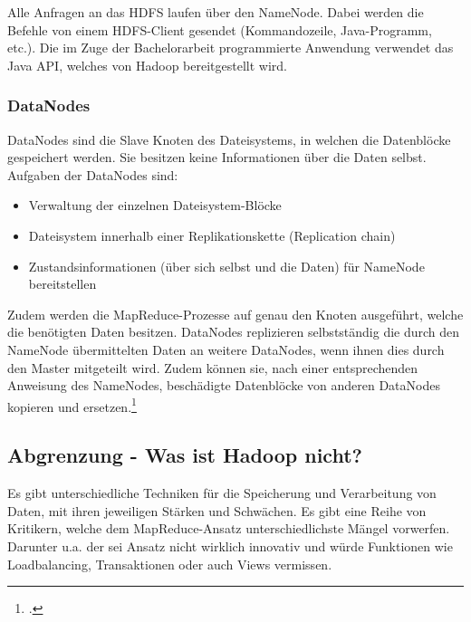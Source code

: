 Alle Anfragen an das \ac{HDFS} laufen über den NameNode. Dabei werden die Befehle von einem \ac{HDFS}-Client gesendet (Kommandozeile, Java-Programm, etc.). Die im Zuge der Bachelorarbeit programmierte Anwendung verwendet das Java \ac{API}, welches von Hadoop bereitgestellt wird.

\subsubsection{DataNodes}
DataNodes sind die Slave Knoten des Dateisystems, in welchen die Datenblöcke gespeichert werden. Sie besitzen keine Informationen über die Daten selbst. Aufgaben der DataNodes sind:

\begin{itemize}
	\item Verwaltung der einzelnen Dateisystem-Blöcke
	\item Dateisystem innerhalb einer Replikationskette (Replication chain)
	\item Zustandsinformationen (über sich selbst und die Daten) für NameNode bereitstellen
\end{itemize}

Zudem werden die MapReduce-Prozesse auf genau den Knoten ausgeführt, welche die benötigten Daten besitzen. DataNodes replizieren selbstständig die durch den NameNode übermittelten Daten an weitere DataNodes, wenn ihnen dies durch den Master mitgeteilt wird. Zudem können sie, nach einer entsprechenden Anweisung des NameNodes, beschädigte Datenblöcke von anderen DataNodes kopieren und ersetzen.\footcite[Vgl.][S. 25 f.]{Wartala.2012}



\subsection{Abgrenzung - Was ist Hadoop nicht?}
Es gibt unterschiedliche Techniken für die Speicherung und Verarbeitung von Daten, mit ihren jeweiligen Stärken und Schwächen. Es gibt eine Reihe von Kritikern, welche dem MapReduce-Ansatz unterschiedlichste Mängel vorwerfen. Darunter u.a. der sei Ansatz nicht wirklich innovativ und würde Funktionen wie Loadbalancing, Transaktionen oder auch Views vermissen.

